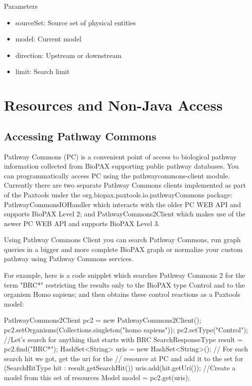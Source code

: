 \documentclass{tufte-book}
\begin{document}
\begin{itemize}
Parameters

\begin{itemize}
\item sourceSet: Source set of physical entities
\item model: Current model
\item direction: Upstream or downstream
\item limit: Search limit
\end{itemize}
\end{itemize}

\chapter{Resources and Non-Java Access}

\section{Accessing Pathway Commons }
Pathway Commons (PC) is a convenient point of access to biological pathway information collected from BioPAX supporting public pathway databases. You can programmatically access PC using the pathwaycommons-client module. Currently there are two separate Pathway Commons clients implemented as part of the Paxtools under the org.biopax.paxtools.io.pathwayCommons package: PathwayCommonsIOHandler which interacts with the older PC WEB API and supports BioPAX Level 2; and PathwayCommons2Client which makes use of the newer PC WEB API and supports BioPAX Level 3. 

Using Pathway Commons Client you can search Pathway Commons, run graph queries in a bigger and more complete BioPAX graph or normalize your custom pathway using Pathway Commons services.

For example, here is a code snipplet which searches Pathway Commons 2 for the term "BRC*" restricting the results only to the BioPAX type Control and to the organism Homo sapiens; and then obtains these control reactions as a Paxtools model:

\begin{javacode}
  PathwayCommons2Client pc2 = new PathwayCommons2Client();
  pc2.setOrganisms(Collections.singleton("homo sapiens"));
  pc2.setType("Control");
  //Let's search for anything that starts with BRC
  SearchResponseType result = pc2.find("BRC*");
  HashSet<String> uris = new HashSet<String>();
  // For each search hit we got, get the uri for the 
 // resource at PC and add it to the set 
  for (SearchHitType hit : result.getSearchHit())
  {
   uris.add(hit.getUri());
  }
  //Create a model from this set of resources
  Model model = pc2.get(uris);
\end{javacode}
\end{document}
